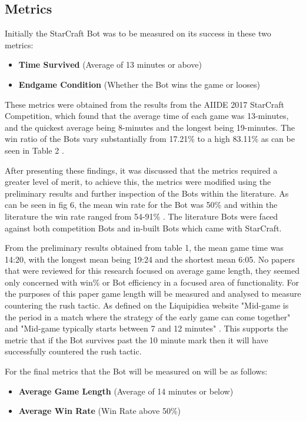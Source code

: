 \documentclass[journal]{IEEEtran}
\begin{document}
\subsection{Metrics}

Initially the StarCraft Bot was to be measured on its success in these two metrics:
\begin{itemize}
	\item \textbf{Time Survived} (Average of 13 minutes or above)
	\item \textbf{Endgame Condition} (Whether the Bot wins the game or looses)
\end{itemize}
These metrics were obtained from the results from the AIIDE 2017 StarCraft Competition, which found that the average time of each game was 13-minutes, and the quickest average being 8-minutes and the longest being 19-minutes. The win ratio of the Bots vary substantially from 17.21\% to a high 83.11\% as can be seen in Table 2 \cite{Results}. 

After presenting these findings, it was discussed that the metrics required a greater level of merit, to achieve this, the metrics were modified using the preliminary results and further inspection of the Bots within the literature. As can be seen in fig 6, the mean win rate for the Bot was 50\% and within the literature the win rate ranged from 54-91\% \cite{ELGoal,Swen,OnlineEvo,GoalDriven}. The literature Bots were faced against both competition Bots and in-built Bots which came with StarCraft.

From the preliminary results obtained from table 1, the mean game time was 14:20, with the longest mean being 19:24 and the shortest mean 6:05. No papers that were reviewed for this research focused on average game length, they seemed only concerned with win\% or Bot efficiency in a focused area of functionality. For the purposes of this paper game length will be measured and analysed to measure countering the rush tactic. As defined on the Liquipidiea website "Mid-game is the period in a match where the strategy of the early game can come together" and "Mid-game typically starts between 7 and 12 minutes" \cite{Liqui}. This supports the metric that if the Bot survives past the 10 minute mark then it will have successfully countered the rush tactic. 
\newline

For the final metrics that the Bot will be measured on will be as follows:
\begin{itemize}
	\item \textbf{Average Game Length} (Average of 14 minutes or below)
	\item \textbf{Average Win Rate} (Win Rate above 50\%)
\end{itemize}
\end{document}
